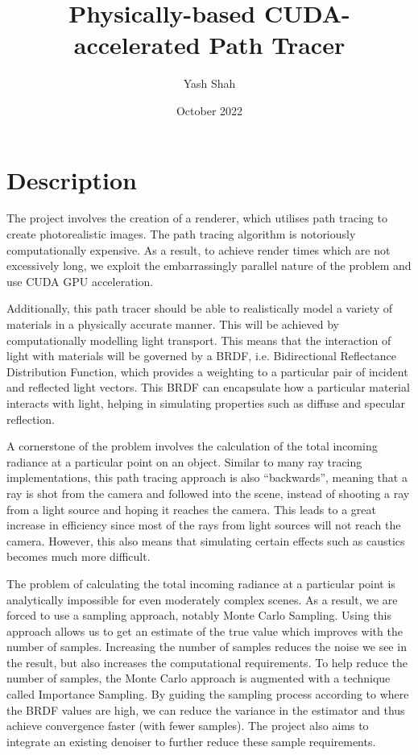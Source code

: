 \documentclass[12pt, a4paper]{article}
\title{Physically-based CUDA-accelerated Path Tracer}
\author{Yash Shah}
\date{October 2022}
\begin{document}
    \maketitle
    
    \section*{Description}
    The project involves the creation of a renderer, which utilises path tracing to create photorealistic images. The path tracing algorithm is notoriously computationally expensive. As a result, to achieve render times which are not excessively long, we exploit the embarrassingly parallel nature of the problem and use CUDA GPU acceleration.

    Additionally, this path tracer should be able to realistically model a variety of materials in a physically accurate manner. This will be achieved by computationally modelling light transport. This means that the interaction of light with materials will be governed by a BRDF, i.e. Bidirectional Reflectance Distribution Function, which provides a weighting to a particular pair of incident and reflected light vectors. This BRDF can encapsulate how a particular material interacts with light, helping in simulating properties such as diffuse and specular reflection.

    A cornerstone of the problem involves the calculation of the total incoming radiance at a particular point on an object. Similar to many ray tracing implementations, this path tracing approach is also “backwards”, meaning that a ray is shot from the camera and followed into the scene, instead of shooting a ray from a light source and hoping it reaches the camera. This leads to a great increase in efficiency since most of the rays from light sources will not reach the camera. However, this also means that simulating certain effects such as caustics becomes much more difficult.

    The problem of calculating the total incoming radiance at a particular point is analytically impossible for even moderately complex scenes. As a result, we are forced to use a sampling approach, notably Monte Carlo Sampling. Using this approach allows us to get an estimate of the true value which improves with the number of samples. Increasing the number of samples reduces the noise we see in the result, but also increases the computational requirements. To help reduce the number of samples, the Monte Carlo approach is augmented with a technique called Importance Sampling. By guiding the sampling process according to where the BRDF values are high, we can reduce the variance in the estimator and thus achieve convergence faster (with fewer samples). The project also aims to integrate an existing denoiser to further reduce these sample requirements.
\end{document}
